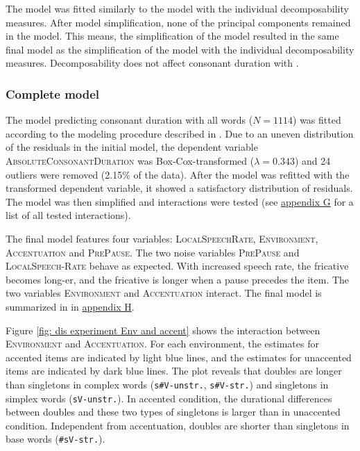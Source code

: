 The model was fitted similarly to the model with the individual decomposability measures. After model simplification, none of the principal components remained in the model. This means, the simplification of the model resulted in the same final model as the simplification of the model with the individual decomposability measures. Decomposability does not affect consonant duration with .


\subsubsection{Complete model}

The model predicting consonant duration with all words ($N=1114$) was fitted according to the modeling procedure described in . Due to an uneven distribution of the residuals in the initial model, the dependent variable \textsc{AbsoluteConsonantDuration} was Box-Cox-transformed ($\lambda = 0.343$) and 24 outliers were removed (2.15\% of the data). After the model was refitted with the transformed dependent variable, it showed a satisfactory distribution of residuals.  The model was then simplified and interactions were tested (see \hyperref[Appendix G Summaries of tested interactions in experimental study]{appendix G} for a list of all tested interactions). 

The final model features four variables: \textsc{LocalSpeechRate}, \textsc{Environment}, \textsc{Accentuation} and \textsc{PrePause}. The two noise variables \textsc{PrePause} and \textsc{LocalSpeech-Rate} behave as expected. With increased speech rate, the fricative becomes long-er, and the fricative is longer when a pause precedes the item.
 The two variables \textsc{Environment} and \textsc{Accentuation} interact. The final model is summarized in  in \hyperref[Appendix H: Model Summaries Experiment]{appendix H}.




Figure \ref{fig:  dis experiment Env and accent} shows the interaction between \textsc{Environment} and \textsc{Accentuation}. For each environment, the estimates for accented items are indicated by light blue lines, and the estimates for unaccented items are indicated by dark blue lines.
The plot reveals that doubles are longer than singletons in complex words (\texttt{s\#V-unstr.}, \texttt{s\#V-str.}) and singletons in simplex words (\texttt{sV-unstr.}). In accented condition, the durational differences between doubles and these two types of singletons is larger than in unaccented condition. 
Independent from accentuation, doubles are shorter than singletons in base words (\texttt{\#sV-str.}).


